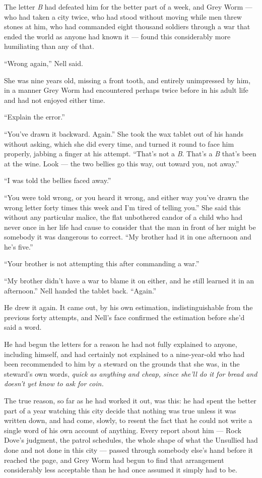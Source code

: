The letter \textit{B} had defeated him for the better part of a week, and Grey Worm — who had taken a city twice, who had stood without moving while men threw stones at him, who had commanded eight thousand soldiers through a war that ended the world as anyone had known it — found this considerably more humiliating than any of that.

“Wrong again,” Nell said.

She was nine years old, missing a front tooth, and entirely unimpressed by him, in a manner Grey Worm had encountered perhaps twice before in his adult life and had not enjoyed either time.

“Explain the error.”

“You’ve drawn it backward. Again.” She took the wax tablet out of his hands without asking, which she did every time, and turned it round to face him properly, jabbing a finger at his attempt. “That’s not a \textit{B}. That’s a \textit{B} that’s been at the wine. Look — the two bellies go this way, out toward you, not away.”

“I was told the bellies faced away.”

“You were told wrong, or you heard it wrong, and either way you’ve drawn the wrong letter forty times this week and I’m tired of telling you.” She said this without any particular malice, the flat unbothered candor of a child who had never once in her life had cause to consider that the man in front of her might be somebody it was dangerous to correct. “My brother had it in one afternoon and he’s five.”

“Your brother is not attempting this after commanding a war.”

“My brother didn’t have a war to blame it on either, and he still learned it in an afternoon.” Nell handed the tablet back. “Again.”

He drew it again. It came out, by his own estimation, indistinguishable from the previous forty attempts, and Nell’s face confirmed the estimation before she’d said a word.

\sceneBreak

He had begun the letters for a reason he had not fully explained to anyone, including himself, and had certainly not explained to a nine-year-old who had been recommended to him by a steward on the grounds that she was, in the steward’s own words, \textit{quick as anything and cheap, since she’ll do it for bread and doesn’t yet know to ask for coin.}

The true reason, so far as he had worked it out, was this: he had spent the better part of a year watching this city decide that nothing was true unless it was written down, and had come, slowly, to resent the fact that he could not write a single word of his own account of anything. Every report about him — Rock Dove’s judgment, the patrol schedules, the whole shape of what the Unsullied had done and not done in this city — passed through somebody else’s hand before it reached the page, and Grey Worm had begun to find that arrangement considerably less acceptable than he had once assumed it simply had to be.

